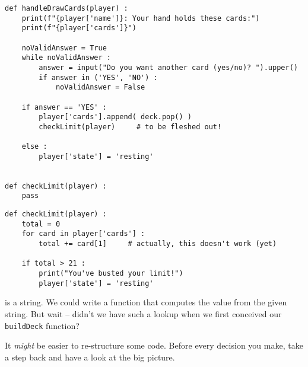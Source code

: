 \begin{frame}[fragile]
%
\begin{codebox}
\begin{verbatim}
def handleDrawCards(player) :
    print(f"{player['name']}: Your hand holds these cards:")
    print(f"{player['cards']}")
    
    noValidAnswer = True
    while noValidAnswer :
        answer = input("Do you want another card (yes/no)? ").upper()
        if answer in ('YES', 'NO') :
            noValidAnswer = False
    
    if answer == 'YES' :
        player['cards'].append( deck.pop() )
        checkLimit(player)     # to be fleshed out!
        
    else :
        player['state'] = 'resting'


def checkLimit(player) :
    pass
\end{verbatim}
\end{codebox}
%
\end{frame}


\begin{frame}[fragile]
%
\begin{codebox}
\begin{verbatim}
def checkLimit(player) :
    total = 0
    for card in player['cards'] :
        total += card[1]     # actually, this doesn't work (yet)
    
    if total > 21 :
        print("You've busted your limit!")
        player['state'] = 'resting'
\end{verbatim}
\end{codebox}
%
\begin{warnbox}
 is a string. We could write a function that computes the value from the given string. But wait -- didn't we have such a lookup when we first conceived our \texttt{buildDeck} function?

It \emph{might} be easier to re-structure some code. Before every decision you make, take a step back and have a look at the big picture.
\end{warnbox}
%
\end{frame}


